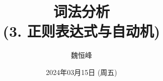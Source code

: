 \documentclass[]{beamer}
\title[词法分析]{词法分析 \\ (3. 正则表达式与自动机)}
\author[魏恒峰]{\large 魏恒峰}
\institute{hfwei@nju.edu.cn}
\date{2024年03月15日 (周五)}
\begin{document}
\maketitle













\thankyou{}

\end{document}
